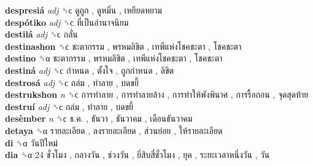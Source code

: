 \textbf{despresiá} \emph{adj}  ␝ϲ   ดูถูก ,  ดูหมิ่น ,  เหยียดหยาม   \\
\textbf{despótiko} \emph{adj}  ␝ϲ   ที่เป็นอำนาจนิยม   \\
\textbf{destilá} \emph{adj}  ␝ϲ   กลั่น   \\
\textbf{destinashon} ␝ϲ   ชะตากรรม ,  พรหมลิขิต ,  เทพีแห่งโชคชะตา ,  โชคชะตา   \\
\textbf{destino} ␝α   ชะตากรรม ,  พรหมลิขิต ,  เทพีแห่งโชคชะตา ,  โชคชะตา   \\
\textbf{destiná} \emph{adj}  ␝ϲ   กำหนด ,  ตั้งใจ ,  ถูกกำหนด ,  ลิขิต   \\
\textbf{destrosá} \emph{adj}  ␝ϲ   ถล่ม ,  ทำลาย ,  บดขยี้   \\
\textbf{destrukshon} \emph{n}  ␝ϲ   การทำลาย ,  การทำลายล้าง ,  การทำให้พังพินาศ ,  การรื้อถอน ,  จุดสุดท้าย   \\
\textbf{destruí} \emph{adj}  ␝ϲ   ถล่ม ,  ทำลาย ,  บดขยี้   \\
\textbf{desèmber} \emph{n}  ␝ϲ   ธ.ค. ,  ธันวา ,  ธันวาคม ,  เดือนธันวาคม   \\
\textbf{detaya} ␝α   รายละเอียด ,  ลงรายละเอียด ,  ส่วนย่อย ,  ให้รายละเอียด   \\
\textbf{di} ␝α   วันปีใหม่   \\
\textbf{dia} ␝α   24 ชั่วโมง ,  กลางวัน ,  ช่วงวัน ,  ยี่สิบสี่ชั่วโมง ,  ยุค ,  ระยะเวลาหนึ่งวัน ,  วัน   \\
